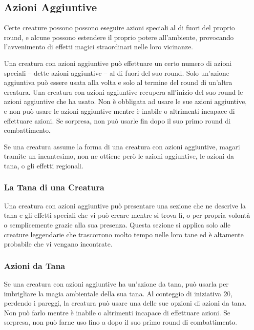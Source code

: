 \begin{multicols}{2}
\subsection{Azioni Aggiuntive}

Certe creature possono  possono eseguire azioni speciali al di fuori del proprio  round, e alcune possono estendere il proprio potere  all'ambiente, provocando l'avvenimento di effetti magici  straordinari nelle loro vicinanze.

Una creatura con azioni aggiuntive può effettuare un certo  numero di azioni speciali -- dette azioni aggiuntive -- al  di fuori del suo round. Solo un'azione aggiuntiva può  essere usata alla volta e solo al termine del round di  un'altra creatura. Una creatura con azioni aggiuntive recupera  all'inizio del suo round le azioni aggiuntive che ha  usato. Non è obbligata ad usare le sue azioni aggiuntive, e non può usare le azioni aggiuntive mentre è inabile o altrimenti incapace di effettuare  azioni. Se sorpresa, non può usarle fin dopo il suo  primo round di combattimento.

Se una creatura assume la forma di una creatura con azioni aggiuntive, magari tramite un incantesimo, non ne  ottiene però le azioni aggiuntive, le azioni da tana, o  gli effetti regionali.

\subsubsection{La Tana di una Creatura}

Una creatura con azioni aggiuntive può presentare una sezione che ne descrive la tana e gli effetti speciali che vi può  creare mentre si trova lì, o per propria volontà o  semplicemente grazie alla sua presenza. Questa  sezione si applica solo alle creature leggendarie che  trascorrono molto tempo nelle loro tane ed è altamente  probabile che vi vengano incontrate.

\subsubsection{Azioni da Tana}

Se una creatura con azioni aggiuntive ha un'azione da tana, può  usarla per imbrigliare la magia ambientale della sua  tana. Al conteggio di iniziativa 20, perdendo i pareggi,  la creatura può usare una delle sue opzioni di azioni da  tana. Non può farlo mentre è inabile o altrimenti  incapace di effettuare azioni. Se sorpresa, non può  farne uso fino a dopo il suo primo round di combattimento.


\end{multicols}

